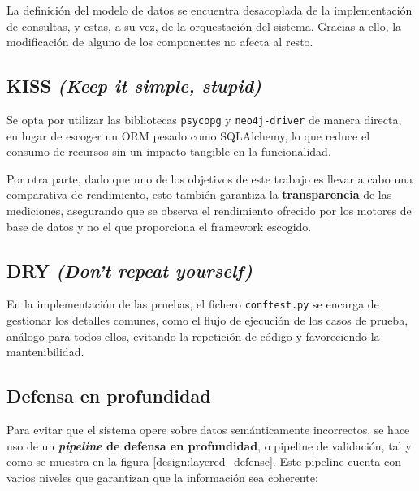 La definición del modelo de datos se encuentra desacoplada de la implementación de consultas, y estas, a su vez, de la orquestación del sistema. Gracias a ello, la modificación de alguno de los componentes no afecta al resto.

\subsection{KISS \textit{(Keep it simple, stupid)}}

Se opta por utilizar las bibliotecas \texttt{psycopg} y \texttt{neo4j-driver} de manera directa, en lugar de escoger un ORM pesado como SQLAlchemy, lo que reduce el consumo de recursos sin un impacto tangible en la funcionalidad.

Por otra parte, dado que uno de los objetivos de este trabajo es llevar a cabo una comparativa de rendimiento, esto también garantiza la \textbf{transparencia} de las mediciones, asegurando que se observa el rendimiento ofrecido por los motores de base de datos y no el que proporciona el framework escogido.

\subsection{DRY \textit{(Don't repeat yourself)}}

En la implementación de las pruebas, el fichero \texttt{conftest.py} se encarga de gestionar los detalles comunes, como el flujo de ejecución de los casos de prueba, análogo para todos ellos, evitando la repetición de código y favoreciendo la mantenibilidad.

\subsection{Defensa en profundidad}

Para evitar que el sistema opere sobre datos semánticamente incorrectos, se hace uso de un \textbf{\textit{pipeline} de defensa en profundidad}, o pipeline de validación, tal y como se muestra en la figura \ref{design:layered_defense}. Este pipeline cuenta con varios niveles que garantizan que la información sea coherente:

